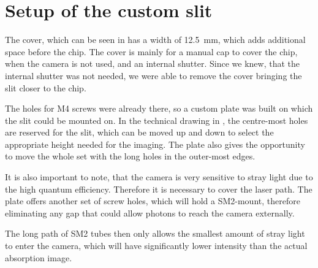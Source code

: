 \chapter{Setup of the custom slit}


The cover, which can be seen in  has a width of \SI{12.5}{\milli\meter}, which adds additional space before the chip. The cover is mainly for a manual cap to cover the chip, when the camera is not used, and an internal shutter. Since we knew, that the internal shutter was not needed, we were able to remove the cover bringing the slit closer to the chip.

The holes for M4 screws were already there, so a custom plate was built on which the slit could be mounted on.
In the technical drawing in , the centre-most holes are reserved for the slit, which can be moved up and down to select the appropriate height needed for the imaging.
The plate also gives the opportunity to move the whole set with the long holes in the outer-most edges.

It is also important to note, that the camera is very sensitive to stray light due to the high quantum efficiency. Therefore it is necessary to cover the laser path. The plate offers another set of screw holes, which will hold a SM2-mount, therefore eliminating any gap that could allow photons to reach the camera externally.

The long path of SM2 tubes then only allows the smallest amount of stray light to enter the camera, which will have significantly lower intensity than the actual absorption image.